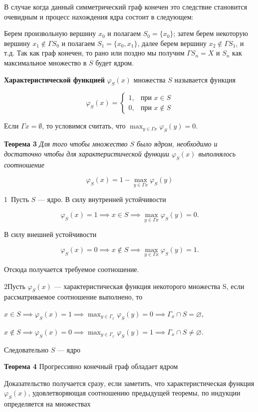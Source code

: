 В случае когда данный симметрический граф конечен это следствие становится очевидным и процесс нахождения ядра состоит в следующем:

Берем произвольную вершину $x_0$ и полагаем $S_0 = \{x_0\}$; затем берем некоторую вершину $x_1 \notin \Gamma S_0$ и полагаем $S_1 = \{x_0, x_1\}$, далее берем вершину $x_2 \notin \Gamma S_1$, и т.д. Так как граф конечен, то рано или поздно мы получим $\Gamma S_n = X$ и $S_n$ как максимальное множество в $S$ будет ядром.

\textbf{Характеристической функцией} $\varphi_S(x)$ множества $S$ называется функция

\[
\varphi_S(x) = 
\begin{cases} 
1, & \text{при } x \in S \\ 
0, & \text{при } x \notin S 
\end{cases}
\]

Если $\Gamma x = \emptyset$, то условимся считать, что $\max_{y \in \Gamma x} \varphi_S(y) = 0$.

\textbf{Теорема 3} \textit{Для того чтобы множество $S$ было ядром, необходимо и достаточно чтобы для характеристической функции $\varphi_S(x)$ выполнялось соотношение}

\[
\varphi_S(x) = 1 - \max_{y \in \Gamma x} \varphi_S(y)
\]

1\textdegree \ Пусть $S$ — ядро. В силу внутренней устойчивости

\[
\varphi_S(x) = 1 \implies x \in S \implies \max_{y \in \Gamma x} \varphi_S(y) = 0.
\]

В силу внешней устойчивости

\[
\varphi_S(x) = 0 \implies x \notin S \implies \max_{y \in \Gamma x} \varphi_S(y) = 1.
\]

Отсюда получается требуемое соотношение.

2\textdegree  Пусть $\varphi_S(x)$  — характеристическая функция некоторого множества S,  если рассматриваемое соотношение выполнено, то

$x \in S \implies \varphi_S(x) = 1 \implies \max_{y \in \Gamma_x} \varphi_S(y) = 0 \implies \Gamma_x \cap S = \varnothing$,

$x \notin S \implies \varphi_S(x) = 0 \implies \max_{y \in \Gamma_x} \varphi_S(y) = 1 \implies \Gamma_x \cap S \neq \varnothing$.

Следовательно  $S$  — ядро

\textbf{Теорема 4}  Прогрессивно конечный граф обладает ядром

Доказательство получается сразу, если заметить, что характеристическая функция $\varphi_S(x)$,  удовлетворяющая соотношению предыдущей теоремы, по индукции определяется на множествах

